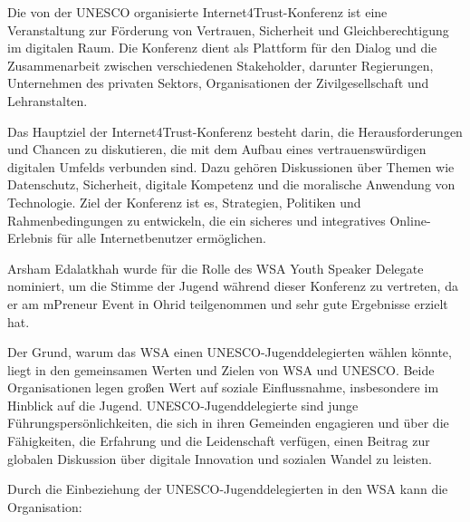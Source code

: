 Die von der UNESCO organisierte Internet4Trust-Konferenz ist eine Veranstaltung zur Förderung von Vertrauen, Sicherheit und Gleichberechtigung im digitalen Raum. Die Konferenz dient als Plattform für den Dialog und die Zusammenarbeit zwischen verschiedenen Stakeholder, darunter Regierungen, Unternehmen des privaten Sektors, Organisationen der Zivilgesellschaft und Lehranstalten.

Das Hauptziel der Internet4Trust-Konferenz besteht darin, die Herausforderungen und Chancen zu diskutieren, die mit dem Aufbau eines vertrauenswürdigen digitalen Umfelds verbunden sind. Dazu gehören Diskussionen über Themen wie Datenschutz, Sicherheit, digitale Kompetenz und die moralische Anwendung von Technologie. Ziel der Konferenz ist es, Strategien, Politiken und Rahmenbedingungen zu entwickeln, die ein sicheres und integratives Online-Erlebnis für alle Internetbenutzer ermöglichen.

Arsham Edalatkhah wurde für die Rolle des WSA Youth Speaker Delegate nominiert, um die Stimme der Jugend während dieser Konferenz zu vertreten, da er am mPreneur Event in Ohrid teilgenommen und sehr gute Ergebnisse erzielt hat.

Der Grund, warum das WSA einen UNESCO-Jugenddelegierten wählen könnte, liegt in den gemeinsamen Werten und Zielen von WSA und UNESCO. Beide Organisationen legen großen Wert auf soziale Einflussnahme, insbesondere im Hinblick auf die Jugend. UNESCO-Jugenddelegierte sind junge Führungspersönlichkeiten, die sich in ihren Gemeinden engagieren und über die Fähigkeiten, die Erfahrung und die Leidenschaft verfügen, einen Beitrag zur globalen Diskussion über digitale Innovation und sozialen Wandel zu leisten.

Durch die Einbeziehung der UNESCO-Jugenddelegierten in den WSA kann die Organisation:

